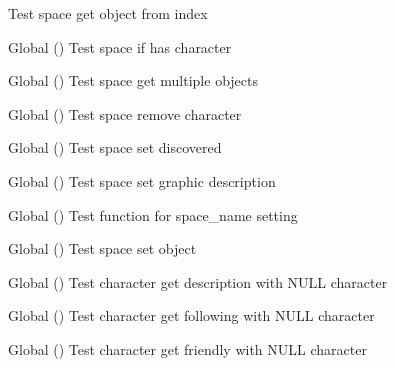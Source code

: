 \begin{DoxyRefList}
%
Test space get object from index  
\item[Global \doxylink{space__test_8c_a997565b0a53f69c9c55aabb231d6a685}{test1\+\_\+space\+\_\+has\+\_\+character} ()]\label{test__test000200}%
%
Test space if has character  
\item[Global \doxylink{space__test_8c_ad2f104cc981de2f9f628fab5db5e2cf6}{test1\+\_\+space\+\_\+multiple\+\_\+objects} ()]\label{test__test000183}%
%
Test space get multiple objects  
\item[Global \doxylink{space__test_8c_a95ad35c6802beb23f398cc7abf3f03e8}{test1\+\_\+space\+\_\+remove\+\_\+character} ()]\label{test__test000202}%
%
Test space remove character  
\item[Global \doxylink{space__test_8c_ad6cbf13878b26080b6ad3a53571a03db}{test1\+\_\+space\+\_\+set\+\_\+discovered} ()]\label{test__test000188}%
%
Test space set discovered  
\item[Global \doxylink{space__test_8c_a068c22b91236896ae1b077a8f7059458}{test1\+\_\+space\+\_\+set\+\_\+gdesc} ()]\label{test__test000186}%
%
Test space set graphic description  
\item[Global \doxylink{space__test_8c_a2569bab6cfeec15f722d232bb8c78c9e}{test1\+\_\+space\+\_\+set\+\_\+name} ()]\label{test__test000172}%
%
Test function for space\+\_\+name setting  
\item[Global \doxylink{space__test_8c_a208ae9352ff979024f6ebef4e791356a}{test1\+\_\+space\+\_\+set\+\_\+object} ()]\label{test__test000175}%
%
Test space set object  
\item[Global \doxylink{character__test_8c_a774b69706adb4d56e65b9bd82afc4e8e}{test2\+\_\+character\+\_\+get\+\_\+description} ()]\label{test__test000011}%
%
Test character get description with NULL character  
\item[Global \doxylink{character__test_8c_a4be32dcb097c3bc887387038c0fdafd8}{test2\+\_\+character\+\_\+get\+\_\+following} ()]\label{test__test000031}%
%
Test character get following with NULL character  
\item[Global \doxylink{character__test_8c_a86a876aee28d07e4f303bc58c5a64f51}{test2\+\_\+character\+\_\+get\+\_\+friendly} ()]\label{test__test000021}%
%
Test character get friendly with NULL character  

\end{DoxyRefList}
